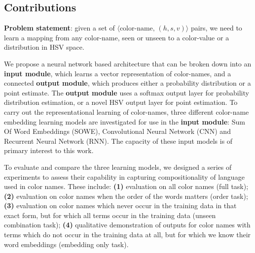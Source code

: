 \documentclass[]{book}
\newcommand{\datapairs}{$\langle\text{color-name},\,(h,s,v)\rangle$}
\begin{document}


\subsection{Contributions}
{\bf Problem statement}: given a set of \datapairs{} pairs, we need to learn a mapping from any color-name, seen or unseen to a color-value or a distribution in HSV space.

We propose a neural network based architecture that can be broken down into an 
\textbf{input module}, which learns a vector representation of color-names,
 and a connected \textbf{output module}, which produces either a probability distribution or a  point estimate.
The \textbf{output module} uses a softmax output layer for probability distribution estimation,
or a novel HSV output layer for point estimation. 
To carry out the representational learning of color-names, three different color-name embedding learning models are investigated for use in the \textbf{input module}: Sum Of Word Embeddings (SOWE), Convolutional Neural Network (CNN) and Recurrent Neural Network (RNN).
The capacity of these input models is of primary interest to this work.

To evaluate and compare the three learning models, we designed a series of experiments to assess their capability in capturing compositionality of language used in color names.
These include:
\textbf{(1)} evaluation on all color names (full task);
\textbf{(2)} evaluation on  color names when the order of the words matters (order task);
\textbf{(3)} evaluation on color names which never occur in the training data in that exact form, but for which all terms occur in the training data (unseen combination task);
\textbf{(4)} qualitative demonstration of outputs for color names with terms which do not occur in the training data at all, but for which we know their word embeddings (embedding only task).
\end{document}
